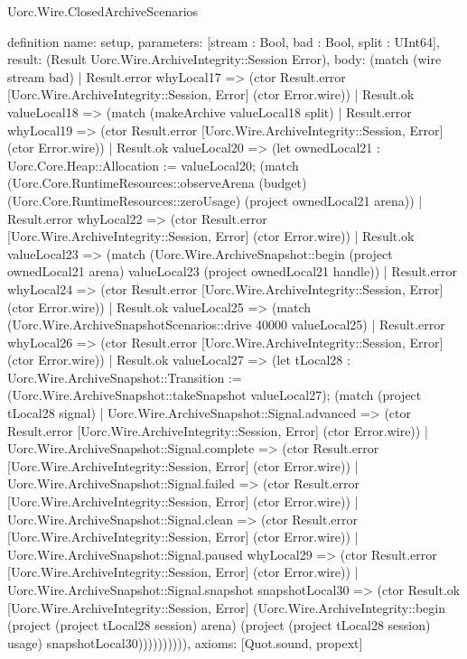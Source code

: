\begin{lexlean}{Uorc.Wire.ClosedArchiveScenarios}
\begin{semanticmodule}
definition{
  name: setup,
  parameters: [stream : Bool, bad : Bool, split : UInt64],
  result: (Result Uorc.Wire.ArchiveIntegrity::Session Error),
  body: (match (wire stream bad)
    | Result.error whyLocal17 => (ctor Result.error [Uorc.Wire.ArchiveIntegrity::Session, Error] (ctor Error.wire))
    | Result.ok valueLocal18 => (match (makeArchive valueLocal18 split)
      | Result.error whyLocal19 => (ctor Result.error [Uorc.Wire.ArchiveIntegrity::Session, Error] (ctor Error.wire))
      | Result.ok valueLocal20 => (let ownedLocal21 : Uorc.Core.Heap::Allocation := valueLocal20; (match (Uorc.Core.RuntimeResources::observeArena (budget) (Uorc.Core.RuntimeResources::zeroUsage) (project ownedLocal21 arena))
        | Result.error whyLocal22 => (ctor Result.error [Uorc.Wire.ArchiveIntegrity::Session, Error] (ctor Error.wire))
        | Result.ok valueLocal23 => (match (Uorc.Wire.ArchiveSnapshot::begin (project ownedLocal21 arena) valueLocal23 (project ownedLocal21 handle))
          | Result.error whyLocal24 => (ctor Result.error [Uorc.Wire.ArchiveIntegrity::Session, Error] (ctor Error.wire))
          | Result.ok valueLocal25 => (match (Uorc.Wire.ArchiveSnapshotScenarios::drive 40000 valueLocal25)
            | Result.error whyLocal26 => (ctor Result.error [Uorc.Wire.ArchiveIntegrity::Session, Error] (ctor Error.wire))
            | Result.ok valueLocal27 => (let tLocal28 : Uorc.Wire.ArchiveSnapshot::Transition := (Uorc.Wire.ArchiveSnapshot::takeSnapshot valueLocal27); (match (project tLocal28 signal)
              | Uorc.Wire.ArchiveSnapshot::Signal.advanced => (ctor Result.error [Uorc.Wire.ArchiveIntegrity::Session, Error] (ctor Error.wire))
              | Uorc.Wire.ArchiveSnapshot::Signal.complete => (ctor Result.error [Uorc.Wire.ArchiveIntegrity::Session, Error] (ctor Error.wire))
              | Uorc.Wire.ArchiveSnapshot::Signal.failed => (ctor Result.error [Uorc.Wire.ArchiveIntegrity::Session, Error] (ctor Error.wire))
              | Uorc.Wire.ArchiveSnapshot::Signal.clean => (ctor Result.error [Uorc.Wire.ArchiveIntegrity::Session, Error] (ctor Error.wire))
              | Uorc.Wire.ArchiveSnapshot::Signal.paused whyLocal29 => (ctor Result.error [Uorc.Wire.ArchiveIntegrity::Session, Error] (ctor Error.wire))
              | Uorc.Wire.ArchiveSnapshot::Signal.snapshot snapshotLocal30 => (ctor Result.ok [Uorc.Wire.ArchiveIntegrity::Session, Error] (Uorc.Wire.ArchiveIntegrity::begin (project (project tLocal28 session) arena) (project (project tLocal28 session) usage) snapshotLocal30)))))))))),
  axioms: [Quot.sound, propext]
}


\end{semanticmodule}
\end{lexlean}
